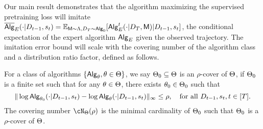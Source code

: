 

Our main result demonstrates that the algorithm maximizing the supervised pretraining loss will imitate $\overline{\mathsf{Alg}}_{{E}}(\cdot|{D}_{t-1},{s}_t) = \mathbb{E}_{{\mathsf{M}}\sim {\Lambda},  {D}_{{T}} \sim {\mathsf{Alg}}_0}[{\mathsf{Alg}}_{{E}}^t(\cdot|{D}_{T},{\mathsf{M}})|{D}_{t-1},{s}_t]$, the conditional expectation of the expert algorithm ${\mathsf{Alg}}_{{E}}$ given the observed trajectory. The imitation error bound will scale with the covering number of the algorithm class and a  distribution ratio factor, defined as follows.

\begin{definition}\label{def:cover_number_general} For a class of algorithms $\{{\mathsf{Alg}}_{\theta},{\theta}\in{\Theta}\}$, 
we say ${\Theta}_0 \subseteq{\Theta}$ is an  $\rho$-cover of ${\Theta}$, if ${\Theta}_0$ is a finite set such that for any ${\theta}\in{\Theta}$, there exists ${\theta}_0\in{\Theta}_0$ such that 
\[
\|\log {\mathsf{Alg}}_{{\theta}_0}(\cdot|{D}_{t-1},{s}_t)-\log {\mathsf{Alg}}_{{\theta}}(\cdot|{D}_{t-1},{s}_t)\|_{\infty}\leq\rho,~~~ \text{for all } {D}_{t-1},{s}_t, t\in[{T}].
\]
The covering number $\cN_{\Parspace}(\rho)$ is the minimal cardinality of ${\Theta}_0$ such that ${\Theta}_0$ is a $\rho$-cover of ${\Theta}$.
\end{definition}








